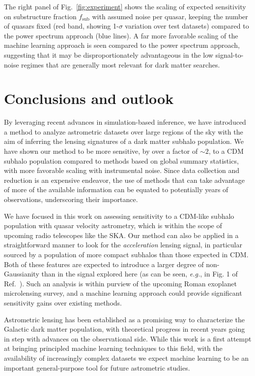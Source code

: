 \documentclass[]{article}
\begin{document}
The right panel of Fig.~\ref{fig:experiment} shows the scaling of expected sensitivity on substructure fraction $f_\mathrm{sub}$ with assumed noise per quasar, keeping the number of quasars fixed (red band, showing 1-$\sigma$ variation over test datasets) compared to the power spectrum approach (blue lines). A far more favorable scaling of the machine learning approach is seen compared to the power spectrum approach, suggesting that it may be disproportionately advantageous in the low signal-to-noise regimes that are generally most relevant for dark matter searches.

\section{Conclusions and outlook}
\label{sec:conclusions}

By leveraging recent advances in simulation-based inference, we have introduced a method to analyze astrometric datasets over large regions of the sky with the aim of inferring the lensing signatures of a dark matter subhalo population. We have shown our method to be more sensitive, by over a factor of $\sim 2$, to a CDM subhalo population compared to methods based on global summary statistics, with more favorable scaling with instrumental noise. Since data collection and reduction is an expensive endeavor, the use of methods that can take advantage of more of the available information can be equated to potentially years of observations, underscoring their importance.

We have focused in this work on assessing sensitivity to a CDM-like subhalo population with quasar velocity astrometry, which is within the scope of upcoming radio telescopes like the SKA. Our method can also be applied in a straightforward manner to look for the \emph{acceleration} lensing signal, in particular sourced by a population of more compact subhalos than those expected in CDM. Both of these features are expected to introduce a larger degree of non-Gaussianity than in the signal explored here (as can be seen, \emph{e.g.}, in Fig. 1 of Ref.~\cite{Mishra-Sharma:2020ynk}). Such an analysis is within purview of the upcoming Roman exoplanet microlensing survey, and a machine learning approach could provide significant sensitivity gains over existing methods.

Astrometric lensing has been established as a promising way to characterize the Galactic dark matter population, with theoretical progress in recent years going in step with advances on the observational side. While this work is a first attempt at bringing principled machine learning techniques to this field, with the availability of increasingly complex datasets we expect machine learning to be an important general-purpose tool for future astrometric studies.
\end{document}
